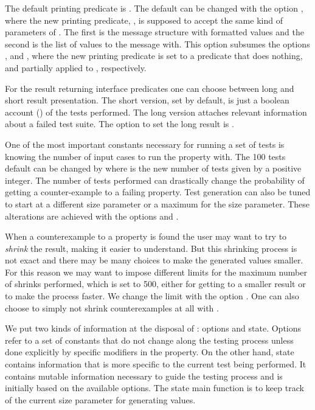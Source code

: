 
The default printing predicate is .
%
The default can be changed with the option
, where the new printing predicate,
, is supposed to accept the same kind of parameters of
.
%
The first is the message structure with formatted values and the second
is the list of values to the message with.
%
This option subsumes the options ,  and
, where the new printing predicate is set to a
predicate that does nothing,  and  partially
applied to , respectively.


For the result returning interface predicates one can choose between
long and short result presentation.
%
The short version, set by default, is just a boolean account
() of the tests performed.
%
The long version attaches relevant information about a failed test
suite.
%
The option to set the long result is .


One of the most important constants necessary for running a set of tests
is knowing the number of input cases to run the property with.
%
The 100 tests default can be changed by  where
 is the new number of tests given by a positive integer.
%
The number of tests performed can drastically change the probability of
getting a counter-example to a failing property.
%
Test generation can also be tuned to start at a different size parameter
or a maximum for the size parameter.
%
These alterations are achieved with the options
 and .


When a counterexample to a property is found the user may want \plqc{}
to try to \emph{shrink} the result, making it easier to understand.
%
But this shrinking process is not exact and there may be many choices to
make the generated values smaller.
%
For this reason we may want to impose different limits for the maximum
number of shrinks performed, which is set to 500, either for getting to
a smaller result or to make the process faster.
%
We change the limit with the option .
%
One can also choose to simply not shrink counterexamples at all with
.


We put two kinds of information at the disposal of \plqc{}: options and
state.
%
Options refer to a set of constants that do not change along the testing
process unless done explicitly by specific modifiers in the property.
%
On the other hand, state contains information that is more specific to
the current test being performed.
%
It contains mutable information necessary to guide the testing process
and is initially based on the available options.
%
The state main function is to keep track of the current size parameter
for generating values.


